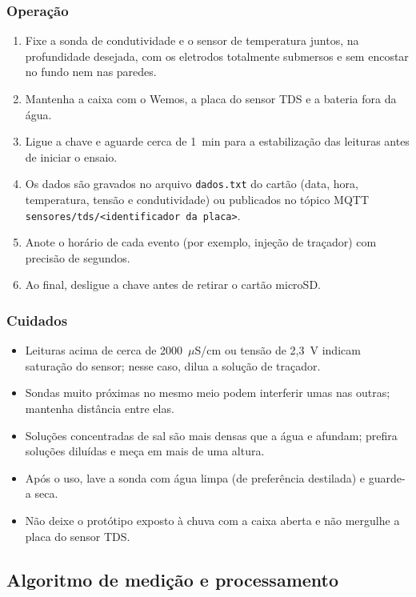\documentclass[12pt,a4paper]{article}
\providecommand{\uScm}{\ensuremath{\mu}S/cm}
\begin{document}
\subsubsection{Operação}
\begin{enumerate}
  \item Fixe a sonda de condutividade e o sensor de temperatura juntos, na profundidade desejada, com os eletrodos totalmente submersos e sem encostar no fundo nem nas paredes.
  \item Mantenha a caixa com o Wemos, a placa do sensor TDS e a bateria fora da água.
  \item Ligue a chave e aguarde cerca de 1~min para a estabilização das leituras antes de iniciar o ensaio.
  \item Os dados são gravados no arquivo \texttt{dados.txt} do cartão (data, hora, temperatura, tensão e condutividade) ou publicados no tópico MQTT \texttt{sensores/tds/}\allowbreak\texttt{<identificador da placa>}.
  \item Anote o horário de cada evento (por exemplo, injeção de traçador) com precisão de segundos.
  \item Ao final, desligue a chave antes de retirar o cartão microSD.
\end{enumerate}

\subsubsection{Cuidados}
\begin{itemize}
  \item Leituras acima de cerca de 2000~\uScm{} ou tensão de 2,3~V indicam saturação do sensor; nesse caso, dilua a solução de traçador.
  \item Sondas muito próximas no mesmo meio podem interferir umas nas outras; mantenha distância entre elas.
  \item Soluções concentradas de sal são mais densas que a água e afundam; prefira soluções diluídas e meça em mais de uma altura.
  \item Após o uso, lave a sonda com água limpa (de preferência destilada) e guarde-a seca.
  \item Não deixe o protótipo exposto à chuva com a caixa aberta e não mergulhe a placa do sensor TDS.
\end{itemize}

\subsection{Algoritmo de medição e processamento}
\label{sec:algoritmo}
\end{document}
